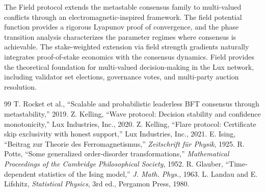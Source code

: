 \documentclass[11pt,a4paper]{article}
\begin{document}
The Field protocol extends the metastable consensus family to multi-valued conflicts
through an electromagnetic-inspired framework. The field potential function provides
a rigorous Lyapunov proof of convergence, and the phase transition analysis characterizes
the parameter regimes where consensus is achievable. The stake-weighted extension via
field strength gradients naturally integrates proof-of-stake economics with the consensus
dynamics. Field provides the theoretical foundation for multi-valued decision-making
in the Lux network, including validator set elections, governance votes, and multi-party
auction resolution.

\begin{thebibliography}{99}
 T. Rocket et al., ``Scalable and probabilistic leaderless BFT consensus through metastability,'' 2019.
 Z. Kelling, ``Wave protocol: Decision stability and confidence monotonicity,'' Lux Industries, Inc., 2020.
 Z. Kelling, ``Flare protocol: Certificate skip exclusivity with honest support,'' Lux Industries, Inc., 2021.
 E. Ising, ``Beitrag zur Theorie des Ferromagnetismus,'' \emph{Zeitschrift f\"ur Physik}, 1925.
 R. Potts, ``Some generalized order-disorder transformations,'' \emph{Mathematical Proceedings of the Cambridge Philosophical Society}, 1952.
 R. Glauber, ``Time-dependent statistics of the Ising model,'' \emph{J. Math. Phys.}, 1963.
 L. Landau and E. Lifshitz, \emph{Statistical Physics}, 3rd ed., Pergamon Press, 1980.
\end{thebibliography}
\end{document}
